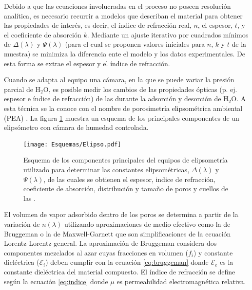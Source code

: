 		Debido a que las ecuaciones involucradas en el proceso no poseen resolución analítica, es necesario recurrir a modelos que describan el material para obtener las propiedades de interés, es decir, el índice de refracción real, $n$, el espesor, $t$, y el coeficiente de absorción $k$. Mediante un ajuste iterativo por cuadrados mínimos de $\Delta(\lambda)$ y $\Psi(\lambda)$ (para el cual se proponen valores iniciales para $n$, $k$ y $t$ de la muestra) se minimiza la diferencia ente el modelo y los datos experimentales. De esta forma se extrae el espesor y el índice de refracción. \cite{TompkinsHarlandG.1999}

		Cuando se adapta al equipo una cámara, en la que se puede variar la presión parcial de H$_2$O, es posible medir los cambios de las propiedades ópticas (p. ej. espesor e índice de refracción) de las \pdm\space durante la adsorción y desorción de H$_2$O. A esta técnica se la conoce con el nombre de porosimetría elipsométrica ambiental (PEA) \cite{Boissiere2005}. La figura \ref{fig:elipso} muestra un esquema de los principales componentes de un elipsómetro con cámara de humedad controlada.

			  \begin{figure}[h]
				\begin{center}
				\texttt{[image: Esquemas/Elipso.pdf]}
			  	\caption[Esquema de la técncia de elipsoporosimetría ambiental]{Esquema de los componentes principales del equipos de elipsometría utilizado para determinar las constantes elipsométricas, $\Delta(\lambda)$ y $\Psi(\lambda)$, de las cuales se obtienen el espesor, indice de refracción, coeficiente de absorción, distribución y tamaño de poros y cuellos de las \pdm.}
			  	\label{fig:elipso}
			  	\end{center}
			  	\end{figure}
		
		El volumen de vapor adsorbido dentro de los poros se determina a partir de la variación de $n(\lambda)$ utilizando aproximaciones de medio efectivo como la de Bruggeman\cite{Bruggeman1935} o la de Maxwell-Garnett\cite{Garnett1906} que son simplificaciones de la ecuación Lorentz-Lorentz general\cite{TompkinsHarlandG.1999}.
		La aproximación de Bruggeman considera dos componentes mezclados al azar cuyas fracciones en volumen ($f_i$) y constante dieléctrica ($\mathcal{E}_i$) deben cumplir con la ecuación \ref{eq:bruggeman} donde $\mathcal{E}_e$ es la constante dieléctrica del material compuesto. El índice de refracción se define según la ecuación \ref{eq:indice} donde $\mu$ es permeabilidad electromagnética relativa.
		
